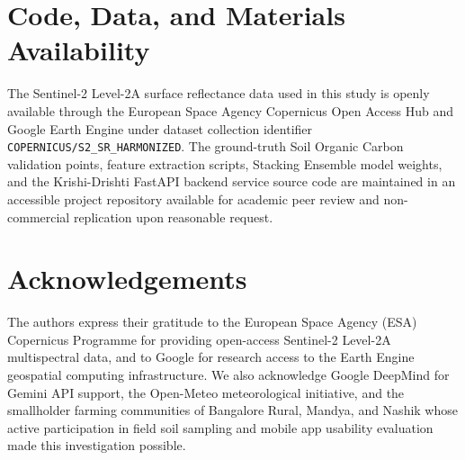 \documentclass[a4paper,10pt]{article}
\begin{document}
\section*{Code, Data, and Materials Availability}

The Sentinel-2 Level-2A surface reflectance data used in this study is openly available through the European Space Agency Copernicus Open Access Hub and Google Earth Engine under dataset collection identifier \texttt{COPERNICUS/S2\_SR\_HARMONIZED}. The ground-truth Soil Organic Carbon validation points, feature extraction scripts, Stacking Ensemble model weights, and the Krishi-Drishti FastAPI backend service source code are maintained in an accessible project repository available for academic peer review and non-commercial replication upon reasonable request.

\section*{Acknowledgements}

The authors express their gratitude to the European Space Agency (ESA) Copernicus Programme for providing open-access Sentinel-2 Level-2A multispectral data, and to Google for research access to the Earth Engine geospatial computing infrastructure. We also acknowledge Google DeepMind for Gemini API support, the Open-Meteo meteorological initiative, and the smallholder farming communities of Bangalore Rural, Mandya, and Nashik whose active participation in field soil sampling and mobile app usability evaluation made this investigation possible.
\end{document}
